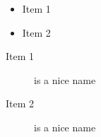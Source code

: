 \begin{Results}
\begin{itemize}
\item Item 1
\item Item 2
\end{itemize}

\begin{description}
\item[Item 1] is a nice name
\item[Item 2] is a nice name
\end{description}
\end{Results}
